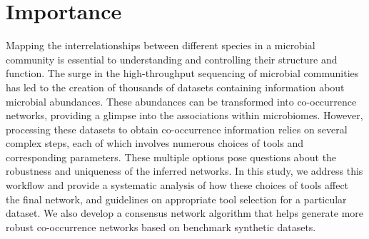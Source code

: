 \section*{Importance}
  Mapping the interrelationships between different species in a microbial community is essential to understanding and controlling their structure and function.
  The surge in the high-throughput sequencing of microbial communities has led to the creation of thousands of datasets containing information about microbial abundances.
  These abundances can be transformed into co-occurrence networks, providing a glimpse into the associations within microbiomes.
  However, processing these datasets to obtain co-occurrence information relies on several complex steps, each of which involves numerous choices of tools and corresponding parameters.
  These multiple options pose questions about the robustness and uniqueness of the inferred networks.
  In this study, we address this workflow and provide a systematic analysis of how these choices of tools affect the final network, and guidelines on appropriate tool selection for a particular dataset.
  We also develop a consensus network algorithm that helps generate more robust co-occurrence networks based on benchmark synthetic datasets.
